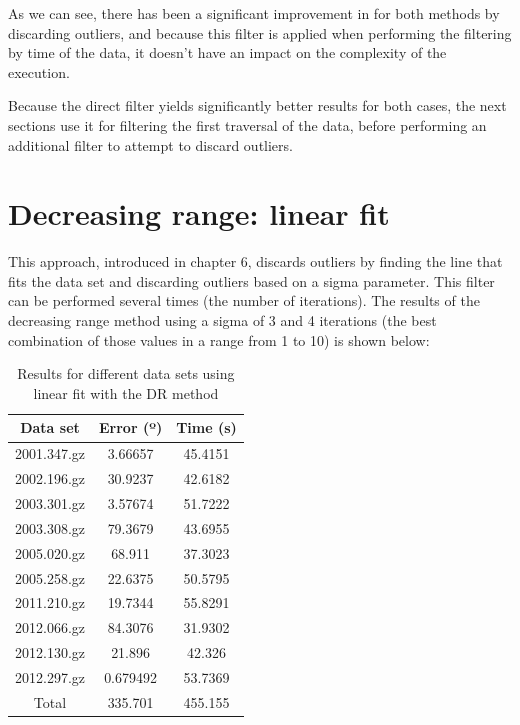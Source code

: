 As we can see, there has been a significant improvement in for both methods by discarding outliers, and because this filter is applied when performing the filtering by time of the data, it doesn't have an impact on the complexity of the execution. 

Because the direct filter yields significantly better results for both cases, the next sections use it for filtering the first traversal of the data, before performing an additional filter to attempt to discard outliers.

\clearpage

\section{Decreasing range: linear fit}

This approach, introduced in chapter 6, discards outliers by finding the line that fits the data set and discarding outliers based on a sigma parameter. This filter can be performed several times (the number of iterations). The results of the decreasing range method using a sigma of 3 and 4 iterations (the best combination of those values in a range from 1 to 10) is shown below:

\begin{table}[h!]
	\centering
	\def\arraystretch{1.2}
	\begin{tabular}{|c c c|} 
		\hline
		Data set & Error (º) & Time (s) \\ [0.5ex] 
		\hline\hline
		2001.347.gz & 3.66657 & 45.4151 \\
		\hline
		2002.196.gz & 30.9237 & 42.6182 \\
		\hline
		2003.301.gz & 3.57674 & 51.7222 \\
		\hline
		2003.308.gz & 79.3679 & 43.6955 \\
		\hline
		2005.020.gz & 68.911 & 37.3023 \\
		\hline
		2005.258.gz & 22.6375 & 50.5795 \\
		\hline
		2011.210.gz & 19.7344 & 55.8291 \\
		\hline
		2012.066.gz & 84.3076 & 31.9302 \\
		\hline
		2012.130.gz & 21.896 & 42.326 \\
		\hline
		2012.297.gz & 0.679492 & 53.7369 \\
		\hline
		Total & 335.701 & 455.155 \\
		\hline
	\end{tabular}
	\caption{Results for different data sets using linear fit with the DR method}
\end{table}

